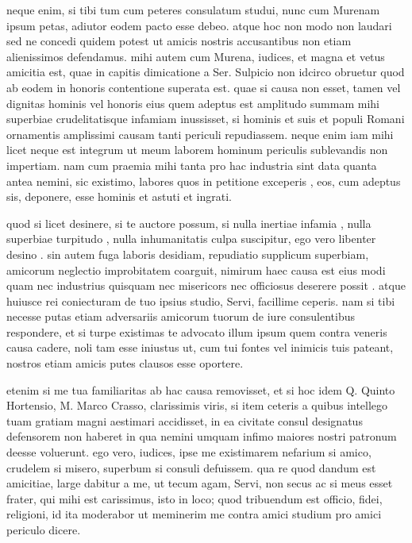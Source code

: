  neque enim, si tibi tum cum peteres consulatum studui, nunc cum Murenam ipsum petas, adiutor eodem pacto esse debeo. atque hoc non modo non laudari sed ne concedi quidem potest ut amicis nostris accusantibus non etiam alienissimos defendamus. mihi autem cum Murena, iudices, et magna et vetus amicitia est, quae in capitis dimicatione a Ser. Sulpicio non idcirco obruetur quod ab eodem in honoris contentione superata est. quae si causa non esset, tamen vel dignitas hominis vel honoris eius quem adeptus est amplitudo summam mihi superbiae crudelitatisque infamiam inussisset, si hominis et suis et populi Romani ornamentis amplissimi causam tanti periculi repudiassem. neque enim iam mihi licet neque est integrum ut meum laborem hominum periculis sublevandis non impertiam. nam cum praemia mihi tanta pro hac industria sint data quanta antea nemini, sic existimo, labores quos in petitione exceperis , eos, cum adeptus sis, deponere, esse hominis et astuti et ingrati.

 quod si licet desinere, si te auctore possum, si nulla inertiae infamia , nulla superbiae turpitudo , nulla inhumanitatis culpa suscipitur, ego vero libenter desino . sin autem fuga laboris desidiam, repudiatio supplicum superbiam, amicorum neglectio improbitatem coarguit, nimirum haec causa est eius modi quam nec industrius quisquam nec misericors nec officiosus deserere possit . atque huiusce rei coniecturam de tuo ipsius studio, Servi, facillime ceperis. nam si tibi necesse putas etiam adversariis amicorum tuorum de iure consulentibus respondere, et si turpe existimas te advocato illum ipsum quem contra veneris causa cadere, noli tam esse iniustus ut, cum tui fontes vel inimicis tuis pateant, nostros etiam amicis putes clausos esse oportere.

 etenim si me tua familiaritas ab hac causa removisset, et si hoc idem Q. Quinto Hortensio, M. Marco Crasso, clarissimis viris, si item ceteris a quibus intellego tuam gratiam magni aestimari accidisset, in ea civitate consul designatus defensorem non haberet in qua nemini umquam infimo maiores nostri patronum deesse voluerunt. ego vero, iudices, ipse me existimarem nefarium si amico, crudelem si misero, superbum si consuli defuissem. qua re quod dandum est amicitiae, large dabitur a me, ut tecum agam, Servi, non secus ac si meus esset frater, qui mihi est carissimus, isto in loco; quod tribuendum est officio, fidei, religioni, id ita moderabor ut meminerim me contra amici studium pro amici periculo dicere.

